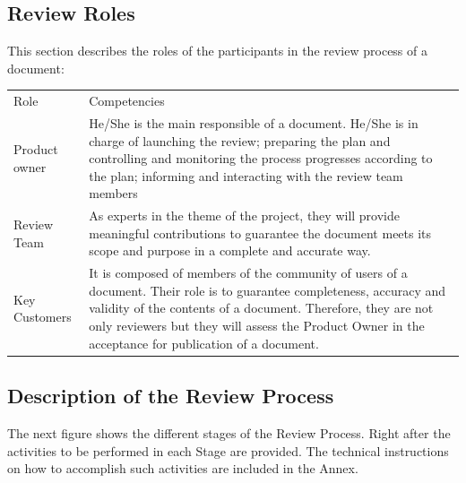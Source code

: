 \documentclass{template/openetcs_article}
\begin{document}
\subsection{Review Roles}

This section describes the roles of the participants in the review process of a document:

\begin{flushleft}
\begin{tabular}{|m{3cm}|m{11cm}|}
\hline
\rowcolor{myblue}
\multicolumn{2}{|c|}{Roles} \\\hline
\rowcolor{lightgray}
Role &
Competencies \\\hline
Product owner &
He/She is the main responsible of a document. He/She is in charge of launching the review; preparing the plan and controlling and monitoring the process progresses according to the plan; informing and interacting with the review team members \\\hline
Review Team &
As experts in the theme of the project, they will provide meaningful contributions to guarantee the document meets its scope and purpose in a complete and accurate way.\\\hline
Key Customers  &
It is composed of members of the community of users of a document. Their role is to guarantee completeness, accuracy and validity of the contents of a document. Therefore, they are not only reviewers but they will assess the Product Owner in the acceptance for publication of a document. \\\hline
\end{tabular}
\end{flushleft}


\subsection{Description of the Review Process}

The next figure shows the different stages of the Review Process. Right after the activities to be performed in each Stage are provided. The technical instructions on how to accomplish such activities are included in the Annex.
\end{document}
